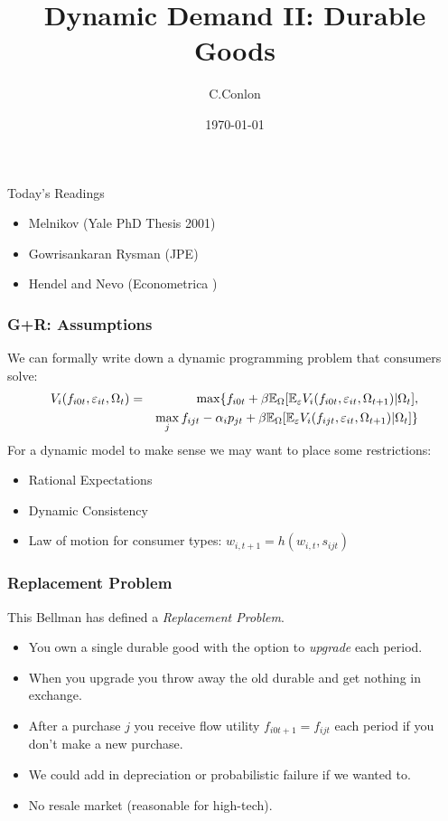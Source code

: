 


\title [Dynamic Demand II]{Dynamic Demand II:
 Durable Goods }
\author{C.Conlon}
\date{\today}


\begin{frame}
\titlepage
\end{frame}

\begin{frame}{Today's Readings}
\begin{itemize}
\item Melnikov (Yale PhD Thesis 2001)
\item Gowrisankaran Rysman (JPE)
\item Hendel and Nevo (Econometrica )
\end{itemize}
\end{frame}


\begin{frame}
\frametitle{G+R: Assumptions}
 We can formally write down a dynamic programming problem that consumers solve:
\begin{eqnarray*}
V_i(f_{i0t},\varepsilon_{i t}, \Omega_t) &=& \max \{ f_{i0t} + \beta \mathbb{E}_{\Omega}[ \mathbb{E}_{\varepsilon} V_i (f_{i0t}, \varepsilon_{it}, \Omega_{t+1}) |\Omega_{t} ] ,\\
&& \max_j f_{ijt}  -\alpha_i p_{jt} + \beta \mathbb{E}_{\Omega}[ \mathbb{E}_{\varepsilon} V_i (f_{ijt}, \varepsilon_{it}, \Omega_{t+1}) |\Omega_{t} ]  \}
\end{eqnarray*}
For a dynamic model to make sense we may want to place some restrictions:
\begin{itemize}
\item Rational Expectations
\item Dynamic Consistency
\item Law of motion for consumer types: $w_{i,t+1} =h(w_{i,t},s_{ijt})$ 
\end{itemize}
\end{frame}

\begin{frame}
\frametitle{Replacement Problem}
This Bellman has defined a \textit{Replacement Problem}.
\begin{itemize}
\item You own a single durable good with the option to \textit{upgrade} each period.
\item When you upgrade \alert{you throw away the old durable and get nothing in exchange}.
\item After a purchase $j$  you receive flow utility $f_{i0t+1} = f_{ijt}$ each period if you don't make a new purchase.
\item We could add in depreciation or probabilistic failure if we wanted to.
\item No resale market (reasonable for high-tech).
\end{itemize}
\end{frame}





